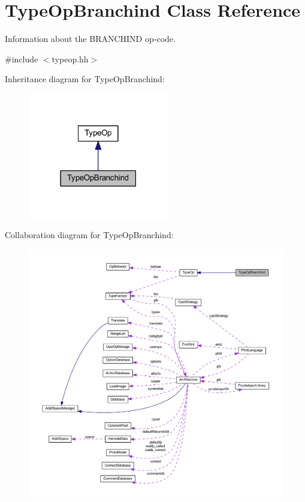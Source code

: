 \hypertarget{class_type_op_branchind}{}\section{Type\+Op\+Branchind Class Reference}
\label{class_type_op_branchind}


Information about the B\+R\+A\+N\+C\+H\+I\+ND op-\/code.  




{\ttfamily \#include $<$typeop.\+hh$>$}



Inheritance diagram for Type\+Op\+Branchind\+:
\nopagebreak
\begin{figure}[H]
\begin{center}
\leavevmode
\includegraphics[width=174pt]{class_type_op_branchind__inherit__graph}
\end{center}
\end{figure}


Collaboration diagram for Type\+Op\+Branchind\+:
\nopagebreak
\begin{figure}[H]
\begin{center}
\leavevmode
\includegraphics[width=350pt]{class_type_op_branchind__coll__graph}
\end{center}
\end{figure}
